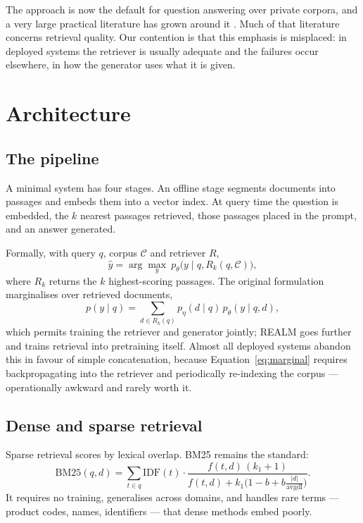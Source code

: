 \documentclass[11pt,a4paper]{article}
\begin{document}
The approach is now the default for question answering over private corpora,
and a very large practical literature has grown around it \cite{gao2023}. Much of that
literature concerns retrieval quality. Our contention is that this emphasis is
misplaced: in deployed systems the retriever is usually adequate and the
failures occur elsewhere, in how the generator uses what it is given.

\section{Architecture}
\label{sec:architecture}

\subsection{The pipeline}

A minimal system has four stages. An offline stage segments documents into
passages and embeds them into a vector index. At query time the question is
embedded, the $k$ nearest passages retrieved, those passages placed in the
prompt, and an answer generated.

Formally, with query $q$, corpus $\mathcal{C}$ and retriever $R$,
\begin{equation}
  \hat{y} = \arg\max_y \ p_\theta\big(y \mid q, R_k(q, \mathcal{C})\big),
\end{equation}
where $R_k$ returns the $k$ highest-scoring passages. The original formulation
\cite{lewis2020} marginalises over retrieved documents,
\begin{equation}
  p(y \mid q) = \sum_{d \in R_k(q)} p_\eta(d \mid q) \, p_\theta(y \mid q, d),
  \label{eq:marginal}
\end{equation}
which permits training the retriever and generator jointly; REALM
\cite{guu2020} goes further and trains retrieval into pretraining itself. Almost all
deployed systems abandon this in favour of simple concatenation, because
Equation~\ref{eq:marginal} requires backpropagating into the retriever and
periodically re-indexing the corpus --- operationally awkward and rarely worth
it.

\subsection{Dense and sparse retrieval}

Sparse retrieval scores by lexical overlap. BM25 \cite{robertson2009} remains
the standard:
\begin{equation}
  \mathrm{BM25}(q, d) = \sum_{t \in q} \mathrm{IDF}(t)
    \cdot \frac{f(t, d)\,(k_1 + 1)}
                {f(t, d) + k_1\big(1 - b + b \frac{|d|}{\mathrm{avgdl}}\big)}.
\end{equation}
It requires no training, generalises across domains, and handles rare terms ---
product codes, names, identifiers --- that dense methods embed poorly.
\end{document}
